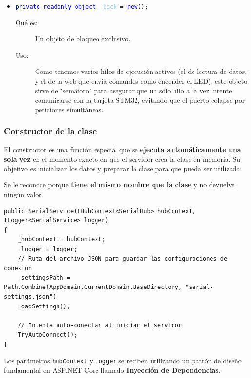 \documentclass[
10pt, %
a4paper, %
oneside, %
headinclude,footinclude, %
BCOR5mm, %
]{scrartcl}
\begin{document}
\begin{enumerate}
\begin{itemize}
		\item \texttt{\textcolor{blue}{private readonly object} \textcolor{SkyBlue}{\_lock} = \textcolor{blue}{new}();}
		\begin{description}
			\item[Qué es:] Un objeto de bloqueo exclusivo.
			\item[Uso:] Como tenemos varios hilos de ejecución activos (el de lectura de datos, y el de la web que envía comandos como encender el LED), este objeto sirve de "semáforo" para asegurar que un sólo hilo a la vez intente comunicarse con la tarjeta STM32, evitando que el puerto colapse por peticiones simultáneas.
		\end{description}
	\end{itemize}
	
\end{enumerate}

\subsubsection{Constructor de la clase}
El constructor es una función especial que se \textbf{ejecuta automáticamente una sola vez} en el momento exacto en que el servidor crea la clase en memoria. Su objetivo es inicializar los datos y preparar la clase para que pueda ser utilizada.

Se le reconoce porque \textbf{tiene el mismo nombre que la clase} y no devuelve ningún valor.
\begin{lstlisting}[style=VSCodeDark]
public SerialService(IHubContext<SerialHub> hubContext, ILogger<SerialService> logger)
{
	_hubContext = hubContext;
	_logger = logger;
	// Ruta del archivo JSON para guardar las configuraciones de conexion
	_settingsPath = Path.Combine(AppDomain.CurrentDomain.BaseDirectory, "serial-settings.json");
	LoadSettings();
	
	// Intenta auto-conectar al iniciar el servidor
	TryAutoConnect();
}
\end{lstlisting}

Los parámetros \texttt{hubContext} y \texttt{logger} se reciben utilizando un patrón de diseño fundamental en ASP.NET Core llamado \textbf{Inyección de Dependencias}.
\end{document}
